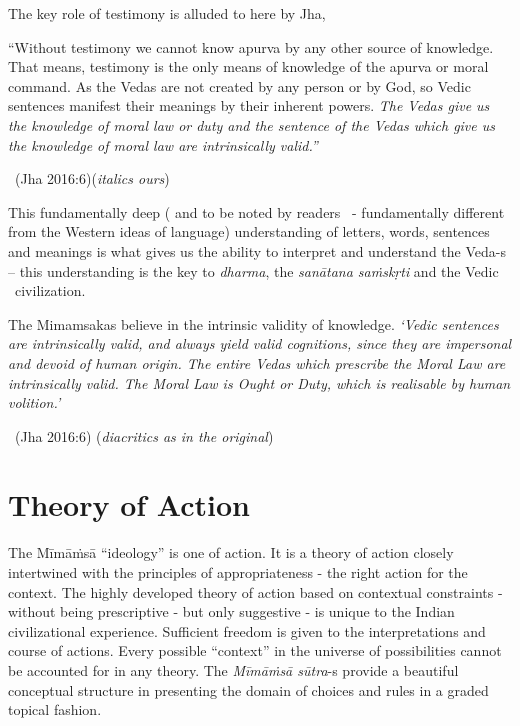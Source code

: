 The key role of testimony is alluded to here by Jha,

\begin{myquote}
“Without testimony we cannot know apurva by any other source of knowledge. That means, testimony is the only means of knowledge of the apurva or moral command. As the Vedas are not created by any person or by God, so Vedic sentences manifest their meanings by their inherent powers. \textit{The Vedas give us the knowledge of moral law or duty and the sentence of the Vedas which give us the knowledge of moral law are intrinsically valid.”}

~\hfill (Jha 2016:6)(\textit{italics ours})
\end{myquote}

This fundamentally deep ( and to be noted by readers  - fundamentally different from the Western ideas of language) understanding of letters, words, sentences and meanings is what gives us the ability to interpret and understand the Veda-s – this understanding is the key to \textit{dharma}, the \textit{sanātana saṁskṛti} and the Vedic  civilization.

\begin{myquote}
The Mimamsakas believe in the intrinsic validity of knowledge. \textit{‘Vedic sentences are intrinsically valid, and always yield valid cognitions, since they are impersonal and devoid of human origin. The entire Vedas which prescribe the Moral Law are intrinsically valid. The Moral Law is Ought or Duty, which is realisable by human volition.’}

~\hfill (Jha 2016:6) (\textit{diacritics as in the original})
\end{myquote}


\section*{Theory of Action}

The Mīmāṁsā “ideology” is one of action. It is a theory of action closely intertwined with the principles of appropriateness - the right action for the context. The highly developed theory of action based on contextual constraints - without being prescriptive - but only suggestive - is unique to the Indian civilizational experience. Sufficient freedom is given to the interpretations and course of actions. Every possible “context” in the universe of possibilities cannot be accounted for in any theory. The \textit{Mīmāṁsā sūtra}-s provide a beautiful conceptual structure in presenting the domain of choices and rules in a graded topical fashion.

